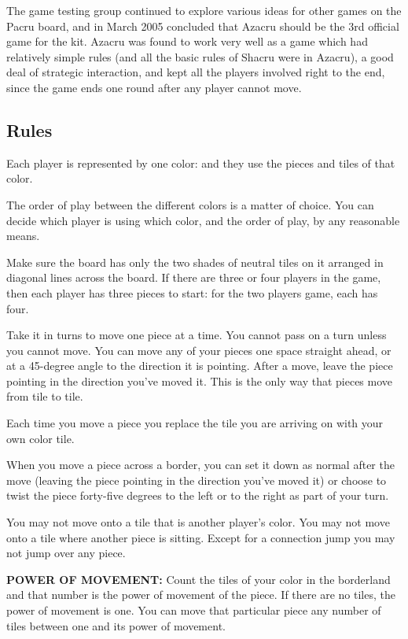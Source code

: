 \documentclass[a4paper]{article}
\begin{document}
The game testing group continued to explore various ideas for other games on the Pacru board, and in March 2005 concluded that Azacru should be the 3rd official game for the kit. Azacru was found to work very well as a game which had relatively simple rules (and all the basic rules of Shacru were in Azacru), a good deal of strategic interaction, and kept all the players involved right to the end, since the game ends one round after any player cannot move.


\subsection{Rules}
Each player is represented by one color: and they use the pieces and tiles of that color.
     
The order of play between the different colors is a matter of choice. You can decide which player is using which color, and the order of play, by any reasonable means.
    
Make sure the board has only the two shades of neutral tiles on it arranged in diagonal lines across the board. If there are three or four players in the game, then each player has three pieces to start: for the two players game, each has four.
    
Take it in turns to move one piece at a time. You cannot pass on a turn unless you cannot move. You can move any of your pieces one space straight ahead, or at a 45-degree angle to the direction it is pointing. After a move, leave the piece pointing in the direction you've moved it. This is the only way that pieces move from tile to tile.
    
Each time you move a piece you replace the tile you are arriving on with your own color tile.
    
When you move a piece across a border, you can set it down as normal after the move (leaving the piece pointing in the direction you've moved it) or choose to twist the piece forty-five degrees to the left or to the right as part of your turn.
    
You may not move onto a tile that is another player's color. You may not move onto a tile where another piece is sitting. Except for a connection jump you may not jump over any piece.
    
\textbf{POWER OF MOVEMENT:} Count the tiles of your color in the borderland and that number is the power of movement of the piece. If there are no tiles, the power of movement is one. You can move that particular piece any number of tiles between one and its power of movement.
    
\end{document}
